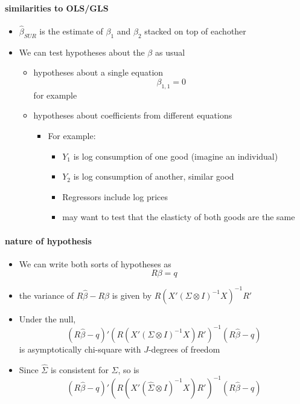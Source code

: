 \paragraph{similarities to OLS/GLS}
\begin{itemize}
\item $\hat\beta_{SUR}$ is the estimate of $\beta_1$ and $\beta_2$
        stacked on top of eachother
\item We can test hypotheses about the $\beta$ as usual
\begin{itemize}
\item hypotheses about a single equation
          \[ \beta_{1,1} = 0 \]
          for example
\item hypotheses about coefficients from different equations
\begin{itemize}
\item For example:
\begin{itemize}
\item $Y_1$ is log consumption of one good (imagine an individual)
\item $Y_2$ is log consumption of another, similar good
\item Regressors include log prices
\item may want to test that the elasticty of both goods are
              the same
\end{itemize}
\end{itemize}
\end{itemize}
\end{itemize}

\paragraph{nature of hypothesis}
\begin{itemize}
\item We can write both sorts of hypotheses as
        \[ R \beta = q \]
\item the variance of $R\hat\beta - R\beta$ is given by $R(X'(\Sigma
        \otimes I)^{-1}X)^{-1}R'$
\item Under the null, 
        \[(R\hat\beta - q)'\left(R(X'(\Sigma \otimes
        I)^{-1}X)R'\right)^{-1}(R\hat\beta - q)\] is asymptotically
        chi-square with $J$-degrees of freedom
\item Since $\hat\Sigma$ is consistent for $\Sigma$, so is
        \[(R\hat\beta - q)'\left(R(X'(\hat\Sigma \otimes
        I)^{-1}X)R'\right)^{-1}(R\hat\beta - q)\]
\end{itemize}

